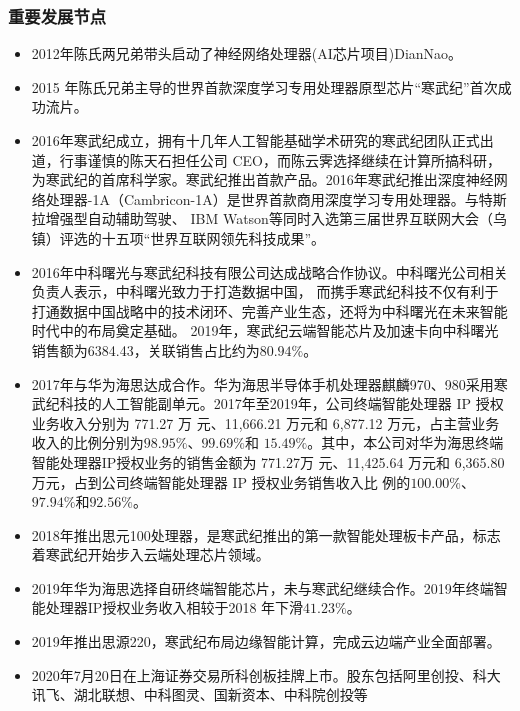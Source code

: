 \subsubsection{重要发展节点}
\begin{itemize}
    \item 2012年陈氏两兄弟带头启动了神经网络处理器(AI芯片项目)DianNao。
    \item 2015 年陈氏兄弟主导的世界首款深度学习专用处理器原型芯片“寒武纪”首次成功流片。
    \item 2016年寒武纪成立，拥有十几年人工智能基础学术研究的寒武纪团队正式出道，行事谨慎的陈天石担任公司 CEO，而陈云霁选择继续在计算所搞科研，为寒武纪的首席科学家。寒武纪推出首款产品。2016年寒武纪推出深度神经网络处理器-1A（Cambricon-1A）是世界首款商用深度学习专用处理器。与特斯拉增强型自动辅助驾驶、
    IBM Watson等同时入选第三届世界互联网大会（乌镇）评选的十五项“世界互联网领先科技成果”。
    \item 2016年中科曙光与寒武纪科技有限公司达成战略合作协议。中科曙光公司相关负责人表示，中科曙光致力于打造数据中国，
    而携手寒武纪科技不仅有利于打通数据中国战略中的技术闭环、完善产业生态，还将为中科曙光在未来智能时代中的布局奠定基础。
    2019年，寒武纪云端智能芯片及加速卡向中科曙光销售额为6384.43，关联销售占比约为$80.94\%$。
    \item 2017年与华为海思达成合作。华为海思半导体手机处理器麒麟970、980采用寒武纪科技的人工智能副单元。2017年至2019年，公司终端智能处理器 IP 授权业务收入分别为 771.27 万
    元、11,666.21 万元和 6,877.12 万元，占主营业务收入的比例分别为$98.95\%$、$99.69\%$和
    $15.49\%$。其中，本公司对华为海思终端智能处理器IP授权业务的销售金额为 771.27万
    元、11,425.64 万元和 6,365.80 万元，占到公司终端智能处理器 IP 授权业务销售收入比
    例的$100.00\%$、$97.94\%$和$92.56\%$。
    \item 2018年推出思元100处理器，是寒武纪推出的第一款智能处理板卡产品，标志着寒武纪开始步入云端处理芯片领域。
    \item 2019年华为海思选择自研终端智能芯片，未与寒武纪继续合作。2019年终端智能处理器IP授权业务收入相较于2018
    年下滑$41.23\%$。
    \item 2019年推出思源220，寒武纪布局边缘智能计算，完成云边端产业全面部署。
    \item 2020年7月20日在上海证券交易所科创板挂牌上市。股东包括阿里创投、科大讯飞、湖北联想、中科图灵、国新资本、中科院创投等
\end{itemize}
